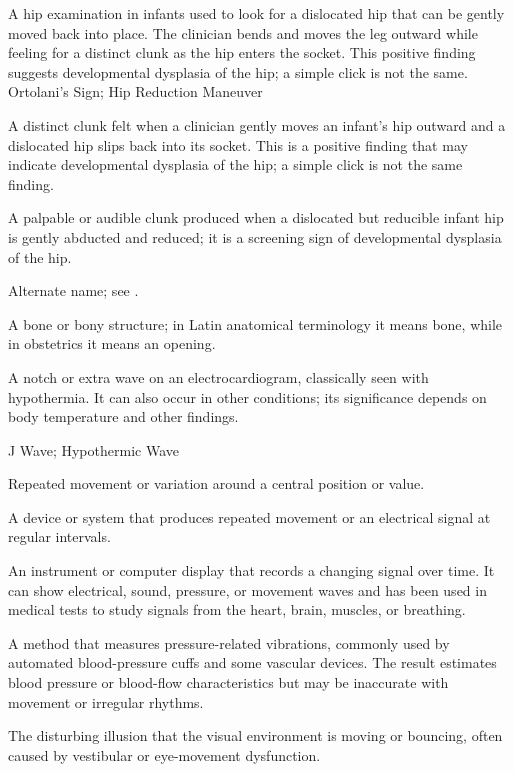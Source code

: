  A hip examination in infants used to look for a dislocated hip that can be gently moved back into place. The clinician bends and moves the leg outward while feeling for a distinct clunk as the hip enters the socket. This positive finding suggests developmental dysplasia of the hip; a simple click is not the same.
\synonyms
Ortolani's Sign; Hip Reduction Maneuver

 A distinct clunk felt when a clinician gently moves an infant's hip outward and a dislocated hip slips back into its socket. This is a positive finding that may indicate developmental dysplasia of the hip; a simple click is not the same finding.

 A palpable or audible clunk produced when a dislocated but reducible infant hip is gently abducted and reduced; it is a screening sign of developmental dysplasia of the hip.

 Alternate name; see .

 A bone or bony structure; in Latin anatomical terminology it means bone, while in obstetrics it means an opening.

 A notch or extra wave on an electrocardiogram, classically seen with hypothermia. It can also occur in other conditions; its significance depends on body temperature and other findings.

\synonyms
J Wave; Hypothermic Wave

 Repeated movement or variation around a central position or value.

 A device or system that produces repeated movement or an electrical signal at regular intervals.

 An instrument or computer display that records a changing signal over time. It can show electrical, sound, pressure, or movement waves and has been used in medical tests to study signals from the heart, brain, muscles, or breathing.

 A method that measures pressure-related vibrations, commonly used by automated blood-pressure cuffs and some vascular devices. The result estimates blood pressure or blood-flow characteristics but may be inaccurate with movement or irregular rhythms.

 The disturbing illusion that the visual environment is moving or bouncing, often caused by vestibular or eye-movement dysfunction.


